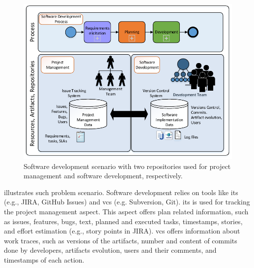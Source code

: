 %


\begin{figure}[h]
	\centering
	\includegraphics[width=\linewidth]{figures/big-picture}
	\caption{Software development scenario with two repositories used for project management and software development, respectively.}
	\label{fig:big-picture-sd}
\end{figure}

 illustrates such problem scenario. Software development relies on tools like \gls{its} (e.g., JIRA, GitHub Issues) and \gls{vcs} (e.g. Subversion, Git). \Gls{its} is used for tracking the project management aspect. This aspect offers plan related information, such as issues, features, bugs, text, planned and executed tasks, timestamps, stories, and effort estimation (e.g., story points in JIRA).
\Gls{vcs} offers information about work traces, such as versions of the artifacts, number and content of commits done by developers, artifacts evolution, users and their comments, and timestamps of each action. 


